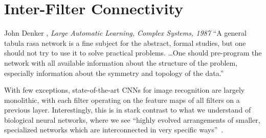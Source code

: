 \documentclass[thesis]{subfiles}
\begin{document}
	\chapter{Inter-Filter Connectivity}\label{deeproots}
	\begin{chapquote}{John Denker \etal, \textit{Large Automatic Learning, Complex Systems, 1987}}
		``A general tabula rasa network is a fine subject for the abstract, formal studies, but one should not try to use it to solve practical problems. \ldots One should pre-program the network with all available information about the structure of the problem, especially information about the symmetry and topology of the data.''
	\end{chapquote}
	
	With few exceptions, state-of-the-art CNNs for image recognition are largely monolithic, with each filter operating on the feature maps of all filters on a previous layer. Interestingly, this is in stark contrast to what we understand of biological neural networks, where we see ``highly evolved arrangements of smaller, specialized networks which are interconnected in very specific ways''~\citep{minsky1988perceptrons}.
	
\end{document}
